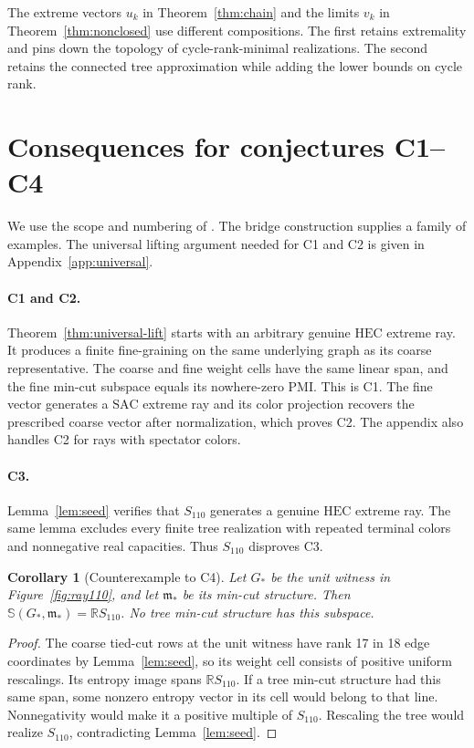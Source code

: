 \documentclass[11pt]{article}
\newtheorem{corollary}[theorem]{Corollary}
\newcommand{\SAC}{\mathrm{SAC}}
\newcommand{\HEC}{\mathrm{HEC}}
\newcommand{\MC}{\mathbb{S}}
\newcommand{\ray}{S_{110}}
\begin{document}
The extreme vectors \(u_k\) in Theorem~\ref{thm:chain} and the limits
\(v_k\) in Theorem~\ref{thm:nonclosed} use different compositions.
The first retains extremality and pins down the topology of
cycle-rank-minimal realizations. The second retains the connected
tree approximation while adding the lower bounds on cycle rank.

\section{Consequences for conjectures C1--C4}
\label{sec:conjectures}

We use the scope and numbering of \cite[Sec.~6.2]{hhr2022}. The bridge
construction supplies a family of examples. The universal lifting
argument needed for C1 and C2 is given in Appendix~\ref{app:universal}.

\paragraph{C1 and C2.}
Theorem~\ref{thm:universal-lift} starts with an arbitrary genuine
\(\HEC\) extreme ray. It produces a finite fine-graining on the same
underlying graph as its coarse representative. The coarse and fine
weight cells have the same linear span, and the fine min-cut subspace
equals its nowhere-zero PMI. This is C1. The fine vector generates a
\(\SAC\) extreme ray and its color projection recovers the prescribed
coarse vector after normalization, which proves C2. The appendix also
handles C2 for rays with spectator colors.

\paragraph{C3.}
Lemma~\ref{lem:seed} verifies that \(\ray\) generates a genuine
\(\HEC\) extreme ray. The same lemma excludes every finite tree
realization with repeated terminal colors and nonnegative real
capacities. Thus \(\ray\) disproves C3.

\begin{corollary}[Counterexample to C4]
\label{cor:c4}
Let \(G_*\) be the unit witness in Figure~\ref{fig:ray110}, and
let \(\mathfrak m_*\) be its min-cut structure. Then
\(\MC(G_*,\mathfrak m_*)=\mathbb R\ray\).
No tree min-cut structure has this subspace.
\end{corollary}

\begin{proof}
The coarse tied-cut rows at the unit witness have rank 17 in
18 edge coordinates by Lemma~\ref{lem:seed}, so its weight cell
consists of positive uniform rescalings. Its entropy image spans
\(\mathbb R\ray\). If a tree min-cut structure had this same
span, some nonzero entropy vector in its cell would belong to
that line. Nonnegativity would make it a positive multiple of
\(\ray\). Rescaling the tree would realize \(\ray\), contradicting
Lemma~\ref{lem:seed}.
\end{proof}
\end{document}
